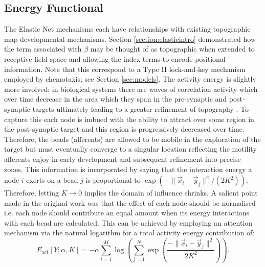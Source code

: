 \subsection{Energy Functional} \label{section:neighbourhoodenergyfunctional}
The Elastic Net mechanisms each have relationships with existing topographic map developmental mechanisms. Section \ref{section:elasticintro} demonstrated how the term associated with $\beta$ may be thought of as topographic when extended to receptive field space and allowing the index terms to encode positional information. Note that this correspond to a Type II lock-and-key mechanism employed by chemotaxis; see Section \ref{sec:models}. The activity energy is slightly more involved: in biological systems there are waves of correlation activity which over time decrease in the area which they span in the pre-synaptic and post-synaptic targets ultimately leading to a greater refinement of topography \cite{Stafford2009, Seabrook2017-fa}. To capture this each node is imbued with the ability to attract over some region in the post-synaptic target and this region is progressively decreased over time. Therefore, the beads (afferents) are allowed to be mobile in the exploration of the target but must eventually converge to a singular location reflecting the motility afferents enjoy in early development and subsequent refinement into precise zones. This information is incorporated by saying that the interaction energy a node $i$ exerts on a bead $j$ is proportional to $\exp\left ( - \lVert \vec{x}_i - \vec{y}_j \rVert^2 / (2 K^2)  \right)$. Therefore, letting $K\rightarrow 0$ implies the domain of influence shrinks. A salient point made in the original work was that the effect of each node should be normalised i.e. each node should contribute an equal amount when its energy interactions with each bead are calculated. This can be achieved by employing an attention mechanism via the natural logarithm for a total activity energy contribution of:
\begin{equation}\label{eq:actneighbourenergy}
E_\text{act}[Y; \alpha, K]  = -\alpha \sum_{i = 1}^{M} \log \left( \sum_{j=1}^N \exp\left ( \frac{- \lVert \vec{x}_i - \vec{y}_j \rVert^2 }{ 2 K^2 }  \right) \right).
\end{equation} 
